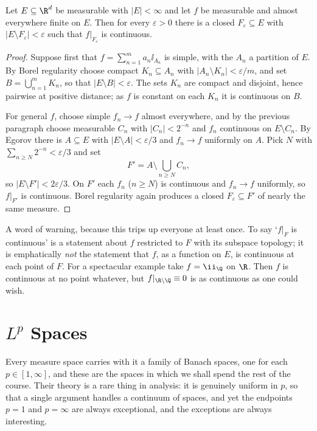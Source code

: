 \begin{theorem}[Lusin]\label{thm:lusin}
	Let $E \subseteq \R^d$ be measurable with $|E| < \infty$ and let $f$ be measurable and almost everywhere finite on $E$. Then for every $\varepsilon > 0$ there is a closed $F_\varepsilon \subseteq E$ with $|E \setminus F_\varepsilon| < \varepsilon$ such that $f|_{F_\varepsilon}$ is continuous.
\end{theorem}

\begin{proof}
	Suppose first that $f = \sum_{n=1}^m a_n \ii_{A_n}$ is simple, with the $A_n$ a partition of $E$. By Borel regularity choose compact $K_n \subseteq A_n$ with $|A_n \setminus K_n| < \varepsilon/m$, and set $B = \bigcup_{n=1}^m K_n$, so that $|E \setminus B| < \varepsilon$. The sets $K_n$ are compact and disjoint, hence pairwise at positive distance; as $f$ is constant on each $K_n$ it is continuous on $B$.

	For general $f$, choose simple $f_n \to f$ almost everywhere, and by the previous paragraph choose measurable $C_n$ with $|C_n| < 2^{-n}$ and $f_n$ continuous on $E \setminus C_n$. By Egorov there is $A \subseteq E$ with $|E \setminus A| < \varepsilon/3$ and $f_n \to f$ uniformly on $A$. Pick $N$ with $\sum_{n \ge N} 2^{-n} < \varepsilon / 3$ and set
	$$F' = A \setminus \bigcup_{n \ge N} C_n,$$
	so $|E \setminus F'| < 2\varepsilon/3$. On $F'$ each $f_n$ ($n \ge N$) is continuous and $f_n \to f$ uniformly, so $f|_{F'}$ is continuous. Borel regularity again produces a closed $F_\varepsilon \subseteq F'$ of nearly the same measure.
\end{proof}

\begin{remark}
	A word of warning, because this trips up everyone at least once. To say `$f|_F$ is continuous' is a statement about $f$ restricted to $F$ with its subspace topology; it is emphatically \emph{not} the statement that $f$, as a function on $E$, is continuous at each point of $F$. For a spectacular example take $f = \ii_\Q$ on $\R$. Then $f$ is continuous at no point whatever, but $f|_{\R \setminus \Q} \equiv 0$ is as continuous as one could wish.
\end{remark}

\section{\texorpdfstring{$L^p$}{Lp} Spaces}\label{sec:lp}

Every measure space carries with it a family of Banach spaces, one for each $p \in [1,\infty]$, and these are the spaces in which we shall spend the rest of the course. Their theory is a rare thing in analysis: it is genuinely uniform in $p$, so that a single argument handles a continuum of spaces, and yet the endpoints $p = 1$ and $p = \infty$ are always exceptional, and the exceptions are always interesting.

